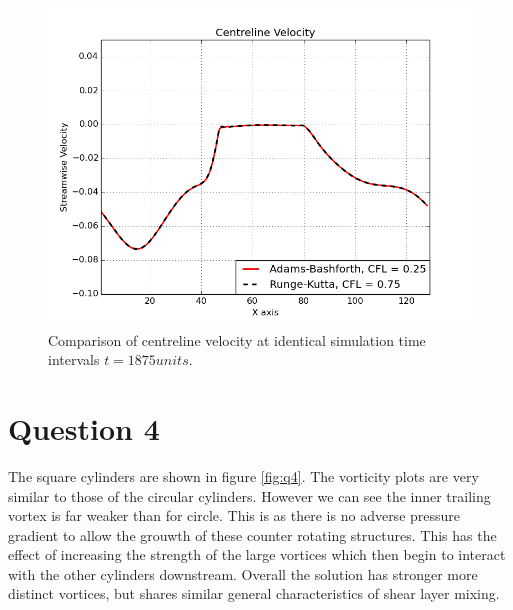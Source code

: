 \documentclass[10pt, a4paper]{article}
\begin{document}
\begin{figure}[!htb]
  \centering
	  \includegraphics[width=.45\linewidth, clip=true, trim=0cm 0cm 0cm 0cm]{velocity}
  \caption{Comparison of centreline velocity at identical simulation time intervals $t = 1875 units$.}
  \label{fig:comp_rkadm}
\end{figure}%

\newpage
\section*{Question 4}

The square cylinders are shown in figure \ref{fig:q4}. The vorticity plots are very similar to those of the circular cylinders. However we can see the inner trailing vortex is far weaker than for circle. This is as there is no adverse pressure gradient to allow the grouwth of these counter rotating structures. This has the effect of increasing the strength of the large vortices which then begin to interact with the other cylinders downstream. Overall the solution has stronger more distinct vortices, but shares similar general characteristics of shear layer mixing.
\end{document}

